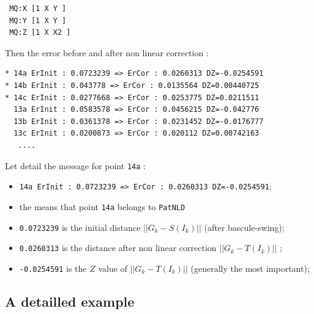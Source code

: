 \begin{verbatim}
 MQ:X [1 X Y ]
 MQ:Y [1 X Y ]
 MQ:Z [1 X X2 ]
\end{verbatim}

Then the error before and after non linear correction :

\begin{verbatim}
* 14a ErInit : 0.0723239 => ErCor : 0.0260313 DZ=-0.0254591
* 14b ErInit : 0.043778 => ErCor : 0.0135564 DZ=0.00440725
* 14c ErInit : 0.0277668 => ErCor : 0.0253775 DZ=0.0211511
  13a ErInit : 0.0583578 => ErCor : 0.0456215 DZ=-0.042776
  13b ErInit : 0.0361378 => ErCor : 0.0231452 DZ=-0.0176777
  13c ErInit : 0.0200873 => ErCor : 0.020112 DZ=0.00742163
   ....
\end{verbatim}

Let detail the message for point {\tt  14a} :
\begin{itemize}

 \item {\tt * 14a ErInit : 0.0723239 => ErCor : 0.0260313 DZ=-0.0254591};
 \item the {\tt *} means that point {\tt  14a} belongs to {\tt PatNLD}
 \item {\tt 0.0723239} is the initial distance $||G_k - S(I_k)||$ (after bascule-swing);
 \item {\tt 0.0260313} is the distance after non linear correction $||G_k - T(I_k)||$ ;
 \item {\tt -0.0254591} is the $Z$ value of $||G_k - T(I_k)||$ (generally the most important);
 
\end{itemize}





\subsection{A detailled example}


























